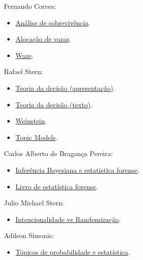 \documentclass[]{book}
\providecommand{\tightlist}{%
  \setlength{\itemsep}{0pt}\setlength{\parskip}{0pt}}
\begin{document}
Fernando Correa:

\begin{itemize}
\tightlist
\item
  \href{https://github.com/abjur/curso/raw/master/pres/curso_tse.pdf}{Análise
  de sobrevivência}.
\item
  \href{https://github.com/abjur/alocTJSP}{Alocação de varas}.
\item
  \href{https://github.com/abjur/tjsp_app}{Waze}.
\end{itemize}

Rafael Stern:

\begin{itemize}
\tightlist
\item
  \href{https://github.com/abjur/curso/raw/master/pres/presentation-teoria-decisao.pdf}{Teoria
  da decisão (apresentação)}.
\item
  \href{https://github.com/abjur/curso/raw/master/pres/teoria_decisao.pdf}{Teoria
  da decisão (texto)}.
\item
  \href{https://github.com/abjur/curso/raw/master/pres/presentation_guidelines.pdf}{Weinstein}.
\item
  \href{https://github.com/abjur/curso/raw/master/pres/mining.pdf}{Topic
  Models}.
\end{itemize}

Carlos Alberto de Bragança Pereira:

\begin{itemize}
\tightlist
\item
  \href{https://github.com/abjur/curso/raw/master/pres/Aula_Brasilia.pdf}{Inferência
  Bayesiana e estatística forense}.
\item
  \href{https://github.com/abjur/curso/raw/master/pres/BAYESIAN_SCIENCE_FORENSIC_W.pdf}{Livro
  de estatística forense}.
\end{itemize}

Julio Michael Stern:

\begin{itemize}
\tightlist
\item
  \href{https://www.ime.usp.br/~jstern/miscellanea/jmsslide/ABJ161.pdf}{Intencionalidade
  vs Randomização}.
\end{itemize}

Adilson Simonis:

\begin{itemize}
\tightlist
\item
  \href{https://github.com/abjur/curso/raw/master/pres/conference_presentation(6).pdf}{Tópicos
  de probabilidade e estatística}.
\end{itemize}
\end{document}
